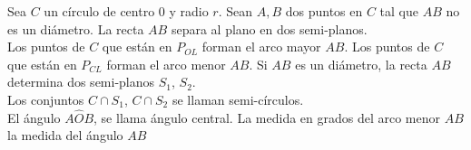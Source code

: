    \begin{def.}
	Sea $C$ un círculo de centro $0$ y radio $r$. Sean $A,B$ dos puntos en $C$ tal que $AB$ no es un diámetro. La recta $AB$ separa al plano en dos semi-planos.\\
	Los puntos de $C$ que están en $P_{OL}$ forman el arco mayor $AB$. Los puntos de $C$ que están en $P_{CL}$ forman el arco menor $AB$. Si $AB$ es un diámetro, la recta $AB$ determina dos semi-planos $S_1$, $S_2$.\\
	Los conjuntos $C \cap S_1$, $C\cap S_2$ se llaman semi-círculos.\\
	El ángulo $A\widehat{O}B$, se llama ángulo central. La medida en grados del arco menor $AB$ la medida del ángulo $AB$

    \end{def.}
